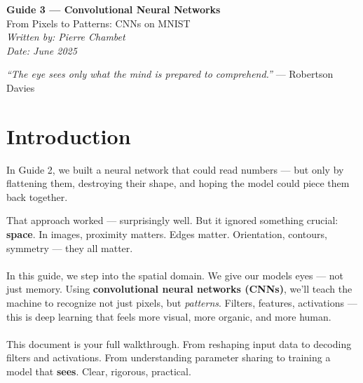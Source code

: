 \documentclass[11pt]{article}
\begin{document}
\begin{center}
    {\LARGE \textbf{Guide 3 — Convolutional Neural Networks}} \\[0.5em]
    {\large From Pixels to Patterns: CNNs on MNIST} \\[1em]
    \textit{Written by: Pierre Chambet} \\
    \textit{Date: June 2025}
\end{center}

\vspace{2em}

\begin{tcolorbox}[colback=gray!5!white, colframe=gray!50!black, title=Quote of the Journey]
\textit{“The eye sees only what the mind is prepared to comprehend.”} \hfill — Robertson Davies
\end{tcolorbox}

\vspace{1.5em}

\section*{Introduction}

In Guide 2, we built a neural network that could read numbers — but only by flattening them, destroying their shape, and hoping the model could piece them back together.

That approach worked — surprisingly well. But it ignored something crucial: \textbf{space}. In images, proximity matters. Edges matter. Orientation, contours, symmetry — they all matter.

\paragraph{} 
In this guide, we step into the spatial domain. We give our models eyes — not just memory. Using \textbf{convolutional neural networks (CNNs)}, we’ll teach the machine to recognize not just pixels, but \textit{patterns}. Filters, features, activations — this is deep learning that feels more visual, more organic, and more human.

\paragraph{}
This document is your full walkthrough. From reshaping input data to decoding filters and activations. From understanding parameter sharing to training a model that \textbf{sees}. Clear, rigorous, practical.
\end{document}
